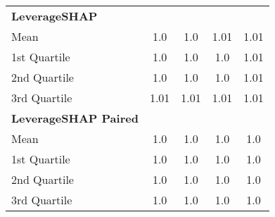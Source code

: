 {\begin{tabular} {lcccc}
\addlinespace[1ex] 
\textbf{LeverageSHAP} &  &  &  &  \\ 
\hspace{7pt}Mean & 1.0 & 1.0 & 1.01 & 1.01 \\ 
\hspace{7pt}1st Quartile & 1.0 & 1.0 & 1.0 & 1.01 \\ 
\hspace{7pt}2nd Quartile & 1.0 & 1.0 & 1.0 & 1.01 \\ 
\hspace{7pt}3rd Quartile & 1.01 & 1.01 & 1.01 & 1.01 \\ 
\addlinespace[1ex] 
\textbf{LeverageSHAP Paired} &  &  &  &  \\ 
\hspace{7pt}Mean & \cellcolor{bronze!60}1.0 & \cellcolor{silver!60}1.0 & \cellcolor{silver!60}1.0 & \cellcolor{bronze!60}1.0 \\ 
\hspace{7pt}1st Quartile & \cellcolor{silver!60}1.0 & \cellcolor{silver!60}1.0 & \cellcolor{gold!60}1.0 & \cellcolor{bronze!60}1.0 \\ 
\hspace{7pt}2nd Quartile & \cellcolor{silver!60}1.0 & \cellcolor{bronze!60}1.0 & \cellcolor{silver!60}1.0 & \cellcolor{silver!60}1.0 \\ 
\hspace{7pt}3rd Quartile & \cellcolor{silver!60}1.0 & \cellcolor{silver!60}1.0 & \cellcolor{silver!60}1.0 & \cellcolor{silver!60}1.0 \\ 
\bottomrule
\end{tabular}}